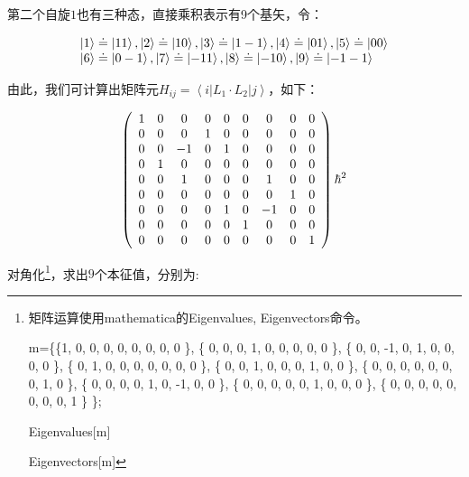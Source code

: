 第二个自旋$1$也有三种态，直接乘积表示有9个基矢，令：


\begin{equation*}
  \begin{array}{l}
 \left| 1 \right\rangle  \buildrel\textstyle.\over= \left| {11} \right\rangle ,\left| 2 \right\rangle  \buildrel\textstyle.\over= \left| {10} \right\rangle ,\left| 3 \right\rangle  \buildrel\textstyle.\over= \left| {1 - 1} \right\rangle ,\left| 4 \right\rangle  \buildrel\textstyle.\over= \left| {01} \right\rangle ,\left| 5 \right\rangle  \buildrel\textstyle.\over= \left| {00} \right\rangle  \\
 \left| 6 \right\rangle  \buildrel\textstyle.\over= \left| {0 - 1} \right\rangle ,\left| 7 \right\rangle  \buildrel\textstyle.\over= \left| { - 11} \right\rangle ,\left| 8 \right\rangle  \buildrel\textstyle.\over= \left| { - 10} \right\rangle ,\left| 9 \right\rangle  \buildrel\textstyle.\over= \left| { - 1 - 1} \right\rangle  \\
 \end{array}
\end{equation*}

由此，我们可计算出矩阵元$H_{ij}  = \left\langle i \right|L_1  \cdot
L_2 \left| j \right\rangle$，如下：


\begin{equation*}
  \left( {\begin{array}{*{20}c}
   1 & 0 & 0 & 0 & 0 & 0 & 0 & 0 & 0  \\
   0 & 0 & 0 & 1 & 0 & 0 & 0 & 0 & 0  \\
   0 & 0 & { - 1} & 0 & 1 & 0 & 0 & 0 & 0  \\
   0 & 1 & 0 & 0 & 0 & 0 & 0 & 0 & 0  \\
   0 & 0 & 1 & 0 & 0 & 0 & 1 & 0 & 0  \\
   0 & 0 & 0 & 0 & 0 & 0 & 0 & 1 & 0  \\
   0 & 0 & 0 & 0 & 1 & 0 & { - 1} & 0 & 0  \\
   0 & 0 & 0 & 0 & 0 & 1 & 0 & 0 & 0  \\
   0 & 0 & 0 & 0 & 0 & 0 & 0 & 0 & 1  \\
\end{array}} \right)\hbar ^2
\end{equation*}

对角化\footnote{ 矩阵运算使用mathematica的Eigenvalues,
Eigenvectors命令。

m=\{\{1, 0, 0, 0, 0, 0, 0, 0, 0 \}, \{ 0, 0, 0, 1, 0, 0, 0, 0, 0 \}, \{ 0, 0, -1, 0, 1, 0, 0, 0, 0 \}, \{ 0, 1, 0, 0, 0, 0, 0, 0, 0 \}, \{ 0, 0, 1, 0, 0, 0, 1, 0, 0 \}, \{ 0, 0, 0, 0, 0, 0, 0, 1, 0 \}, \{ 0, 0, 0, 0, 1, 0, -1, 0, 0 \}, \{ 0, 0, 0, 0, 0, 1, 0, 0, 0 \}, \{ 0, 0, 0, 0, 0, 0, 0, 0, 1 \} \};

Eigenvalues[m]

Eigenvectors[m]}，求出$9$个本征值，分别为:


